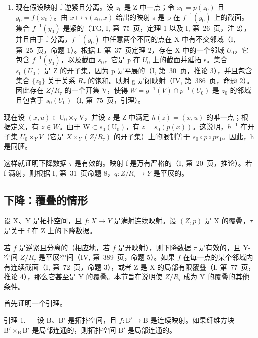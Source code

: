 \begin{enumerate}
\def\labelenumi{\alph{enumi})}
\setcounter{enumi}{1}
\tightlist
\item
  现在假设映射 f 逆紧且分离。设 \(z_{0}\) 是 Z 中一点；令 \(x_{0}=p(z_{0})\) 且 \(y_{0}=f(x_{0})\)。由 \(x\mapsto\tau(z_{0},x)\) 给出的映射 s 是 p 在 \(f^{-1}(y_{0})\) 上的截面。集合 \(f^{-1}(y_{0})\) 是紧的（TG, I, 第~75~页，定理 1 以及 I, 第~26~页，注 2），并且由于 f 分离，\(f^{-1}(y_{0})\) 中任意两个不同的点在 X 中有不交邻域（I, 第~25~页，命题 1）。根据 I, 第~37~页定理 2，存在 X 中的一个邻域 \(U_{0}\)，它包含 \(f^{-1}(y_{0})\)，以及截面 \(s_{0}\)，它是 p 在 \(U_{0}\) 上的截面并延拓 s。集合 \(s_{0}(U_{0})\) 是 Z 的开子集，因为 p 是平展的（I, 第~30~页，推论 3），并且包含集合 \(\{z_{0}\}\) 关于关系 \(R_{\tau}\) 的饱和。映射 g 是闭映射（IV, 第~386~页，命题 2）。因此存在 \(Z/R_{\tau}\) 的一个开集 V，使得 \(W = g^{-1}(V) \cap p^{-1}(U_{0})\) 是 \(z_{0}\) 的邻域且包含于 \(s_{0}(U_{0})\)（I, 第~75~页，引理）。
\end{enumerate}

现在设 \((x,u)\in\mathrm{U}_{0}\times_{\mathrm{Y}}\mathrm{V}\)，并设 z 是 Z 中满足 \(h(z)=(x,u)\) 的唯一点；根据定义，有 \(z\in W\)。由于 \(\mathrm{W}\subset s_{0}(\mathrm{U}_{0})\)，有 \(z=s_{0}(p(x))\)。这说明，\(h^{-1}\) 在开子集 \(U_{0}\times_{Y}V\)（它是 \(X\times_{Y}(Z/R_{\tau})\) 的开子集）上的限制等于 \(s_{0}\circ p\circ pr_{1}\)。因此，h 是同胚。

这样就证明下降数据 \(\tau\) 是有效的。映射 f 是万有严格的（I, 第~20~页，推论）。若 f 满射，则根据 I, 第~31~页命题 8，\(q: Z/R_{\tau} \to Y\) 是平展的。

\subsection{下降：覆叠的情形}

设 X、Y 是拓扑空间，且 \(f: X \to Y\) 是满射连续映射。设 \((Z, p)\) 是 X 的覆叠，\(\tau\) 是关于 f 在 Z 上的下降数据。

若 \(f\) 是逆紧且分离的（相应地，若 \(f\) 是开映射），则下降数据 \(\tau\) 是有效的，且 Y-空间 \(Z/R_{\tau}\) 是平展空间（IV, 第~389~页，命题 5）。如果 \(f\) 在每一点的某个邻域内有连续截面（I, 第~72~页，命题 3），或者 Z 是 X 的局部有限覆叠（I, 第~77~页，推论 4），那么它甚至是 Y 的覆叠。本节旨在说明使 \(Z/R_{\tau}\) 成为 Y 的覆叠的其他条件。

首先证明一个引理。

引理 1. --- 设 B、B' 是拓扑空间，且 \(f: \mathrm{B}' \to \mathrm{B}\) 是连续映射。如果纤维方块 \(\mathrm{B}' \times_{\mathrm{B}} \mathrm{B}'\) 是局部连通的，则拓扑空间 \(\mathrm{B}'\) 是局部连通的。


